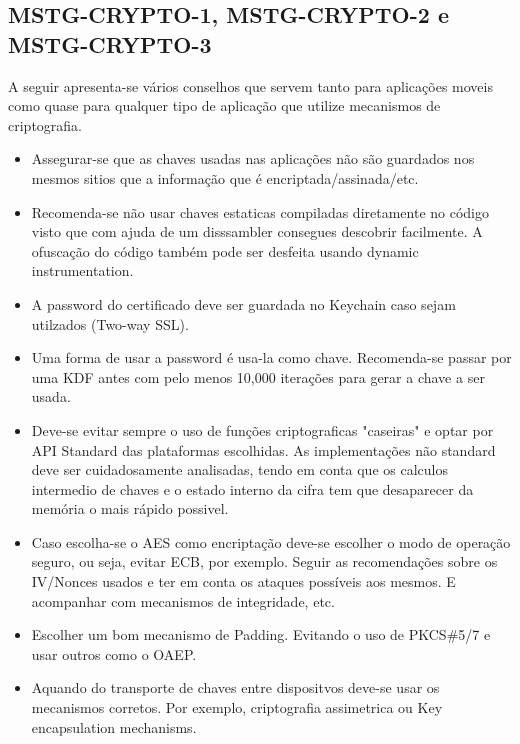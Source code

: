 \subsection{MSTG-CRYPTO-1, MSTG-CRYPTO-2 e MSTG-CRYPTO-3}

A seguir apresenta-se vários conselhos que servem tanto para aplicações moveis como quase para qualquer tipo de aplicação que utilize mecanismos de criptografia.
\begin{itemize}

\item Assegurar-se que as chaves usadas nas aplicações não são guardados nos mesmos sitios que a informação que é encriptada/assinada/etc.

\item Recomenda-se não usar chaves estaticas compiladas diretamente no código visto que com ajuda de um disssambler consegues descobrir facilmente. A ofuscação do código também pode ser desfeita usando dynamic instrumentation.

\item A password do certificado deve ser guardada no Keychain caso sejam utilzados (Two-way SSL).

\item Uma forma de usar a password é usa-la como chave. Recomenda-se passar por uma KDF antes com pelo menos 10,000 iterações para gerar a chave a ser usada.

\item Deve-se evitar sempre o uso de funções criptograficas "caseiras" e optar por API Standard das plataformas escolhidas. As implementações não standard deve ser cuidadosamente analisadas, tendo em conta que os calculos intermedio de chaves e o estado interno da cifra tem que desaparecer da memória o mais rápido possivel.

\item Caso escolha-se o AES como encriptação deve-se escolher o modo de operação seguro, ou seja, evitar ECB, por exemplo. Seguir as recomendações sobre os IV/Nonces usados e ter em conta os ataques possíveis aos mesmos. E acompanhar com mecanismos de integridade, etc.

\item Escolher um bom mecanismo de Padding. Evitando o uso de PKCS\#5/7 e usar outros como o OAEP.  

\item Aquando do transporte de chaves entre dispositvos deve-se usar os mecanismos corretos. Por exemplo, criptografia assimetrica ou Key encapsulation mechanisms.

\end{itemize}

